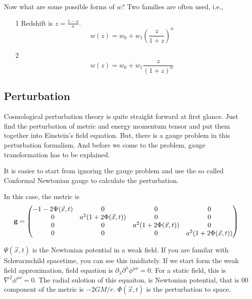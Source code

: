 \documentclass[12pt,a4paper]{book}
\begin{document}
Now what are some possible forms of $w$? Two families are often used, i.e.,
\begin{itemize}
	\item [1]
	Redshift is $z=\frac{1- a}{a}$.
\begin{equation}
w(z) = w_0 + w_1 (\frac{z}{1+z})^n
\end{equation}
	\item [2]
\begin{equation}
w(z) = w_0 + w_1 \frac{z}{(1+z)^n}
\end{equation}
\end{itemize}







\subsection{Perturbation}

Cosmological perturbation theory is quite straight forward at first glance. Just find the perturbation of metric and energy momentum tensor and put them together into Einstein's field equation. But, there is a gauge problem in this perturbation formalism. And before we come to the problem, gauge transformation has to be explained.

It is easier to start from ignoring the gauge problem and use the so called Conformal Newtonian gauge to calculate the perturbation.

In this case, the metric is 
\begin{equation}
\bf{g} =
\begin{pmatrix}
	-1-2\Psi(\vec x, t) & 0 & 0 & 0\\
	0 & a^2(1 +  2\Phi(\vec x,t)) & 0 & 0\\
	0 & 0 & a^2(1 +  2\Phi(\vec x,t)) & 0\\
	0 & 0 & 0 & a^2(1 +  2\Phi(\vec x,t))\\
\end{pmatrix}\label{eq-per-metric}
\end{equation}

$\Psi(\vec x,t)$ is the Newtonian potential in a weak field. If you are familar with Schwarzschild spacetime, you can see this imidiately. If we start form the weak field approximation, field equation is $\partial_\lambda \partial^\lambda \phi^{\mu\nu} = 0$. For a static field, this is $\nabla^2 \phi^{\mu\nu} = 0$. The radial sulotion of this equaiton, is Newtonian potential, that is 00 component of the metric is $-2GM/r$. $\Phi(\vec x,t)$ is the perturbation to space.
\end{document}
